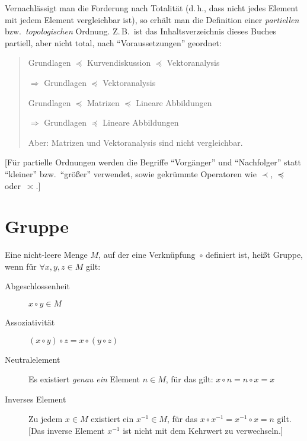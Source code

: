 Vernachlässigt man die Forderung nach Totalität (d.\,h., dass nicht jedes Element mit jedem Element vergleichbar ist), so erhält man die Definition einer \emph{partiellen} bzw.~\emph{topologischen} Ordnung.
Z.\,B.~ist das Inhaltsverzeichnis dieses Buches partiell, aber nicht total, nach \enquote{Voraussetzungen} geordnet:
\noindent\begin{quote}
    \noindent Grundlagen $\preceq$ Kurvendiskussion $\preceq$ Vektoranalysis
    \par\hfill $\Rightarrow$ Grundlagen $\preceq$ Vektoranalysis

    \noindent Grundlagen $\preceq$ Matrizen $\preceq$ Lineare Abbildungen
    \par\hfill $\Rightarrow$ Grundlagen $\preceq$ Lineare Abbildungen
    
    \noindent Aber: Matrizen und Vektoranalysis sind nicht vergleichbar.
\end{quote}
[Für partielle Ordnungen werden die Begriffe \enquote{Vorgänger} und \enquote{Nachfolger} statt \enquote{kleiner} bzw.~\enquote{größer} verwendet, sowie gekrümmte Operatoren wie $\prec$, $\preceq$ oder~$\asymp$.]


\section{Gruppe}

Eine nicht-leere Menge $M$, auf der eine Verknüpfung~$\circ$ definiert
ist, heißt Gruppe, wenn für $\forall x,y,z\in M$
gilt:
\begin{description}
  \item [Abgeschlossenheit] 
	$x\circ y\in M$
  \item [Assoziativität] 
	$(x\circ y)\circ z=x\circ(y\circ z)$
  \item [Neutralelement] 
	Es existiert \emph{genau ein} Element $n\in M$, für das gilt: $x\circ n=n\circ x=x$
  \item [Inverses Element] 
	Zu jedem $x\in M$ existiert ein $x^{-1}\in M$, für das
	$x\circ x^{-1}=x^{-1}\circ x=n$ gilt.
	[Das inverse Element $x^{-1}$ ist nicht mit dem Kehrwert zu verwechseln.]
\end{description}

